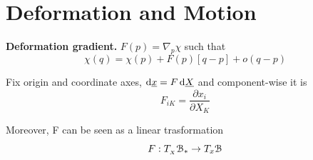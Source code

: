 
\vspace{-1em}


\section{\color{red}Deformation and Motion}


\begin{Figure}
\end{Figure}

\textbf{Deformation gradient.} $F(p)=\nabla_{\!p}\chi$ such that
\begin{equation*}
\chi(q)=\chi(p)+F(p)[q-p]+o(q-p)
\end{equation*}

Fix origin and coordinate axes, $\mathrm{d} \underline{x}=F\,\mathrm{d}\underline{X}$ and component-wise it is
\begin{equation*}
F_{iK}=\frac{\partial x_i}{\partial X_K} 
\end{equation*}

Moreover, F can be seen as a linear trasformation
\begin{equation*}
F:T_{_X} \EuScript{B}_*\to T_x \EuScript{B}
\end{equation*}

\begin{Figure}
\end{Figure}

